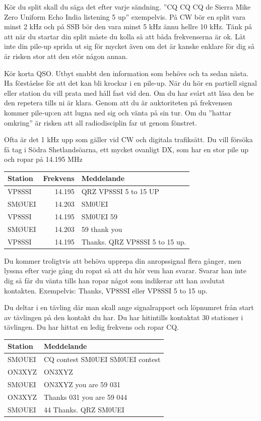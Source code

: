 Kör du split skall du säga det efter varje sändning. ''CQ CQ CQ de Sierra Mike
Zero Uniform Echo India listening 5 up'' exempelvis. På CW bör en split vara
minst 2 kHz och på SSB bör den vara minst 5 kHz ännu hellre 10 kHz. Tänk på att
när du startar din split måste du kolla så att båda frekvenserna är ok. Låt inte
din pile-up sprida ut sig för mycket även om det är kanske enklare för dig så är
risken stor att den stör någon annan.

Kör korta QSO. Utbyt snabbt den information som behövs och ta sedan nästa. Ha
förståelse för att det kan bli krockar i en pile-up. När du hör en partiell
signal eller station du vill prata med håll fast vid den. Om du har svårt att
läsa den be den repetera tills ni är klara. Genom att du är auktoriteten på
frekvensen kommer pile-up:en att lugna ned sig och vänta på sin tur. Om du
''hattar omkring'' är risken att all radiodisciplin far ut genom fönstret.

Ofta är det 1 kHz upp som gäller vid CW och digitala trafiksätt.  Du vill
försöka få tag i Södra Shetlandsöarna, ett mycket ovanligt DX, som har en stor
pile up och ropar på 14.195 MHz

\begin{tabular}{lrl}
	\textbf{Station} & \textbf{Frekvens} & \textbf{Meddelande}                     \\ \hline
	VP8SSI  &   14.195 & QRZ VP8SSI  5 to 15 UP         \\
	SMØUEI  &   14.203 & SM0UEI                         \\
	VP8SSI  &   14.195 & SM0UEI 59                      \\
	SMØUEI  &   14.203 & 59 thank you                   \\
	VP8SSI  &   14.195 & Thanks. QRZ VP8SSI 5 to 15 up.
\end{tabular}

Du kommer troligtvis att behöva upprepa din anropssignal flera gånger, men
lyssna efter varje gång du ropat så att du hör vem han svarar. Svarar han inte
dig så får du vänta tills han ropar något som indikerar att han avslutat
kontakten. Exempelvis: Thanks, VP8SSI eller VP8SSI 5 to 15 up.

Du deltar i en tävling där man skall ange signalrapport och löpnumret från
start av tävlingen på den kontakt du har. Du har hitintills kontaktat 30
stationer i tävlingen. Du har hittat en ledig frekvens och ropar CQ.

\begin{tabular}{ll}
	\textbf{Station} & \textbf{Meddelande}                       \\ \hline
	SMØUEI  & CQ contest SM0UEI SM0UEI contest \\
	ON3XYZ  & ON3XYZ                           \\
	SMØUEI  & ON3XYZ you are 59 031            \\
	ON3XYZ  & Thanks 031 you are 59 044        \\
	SMØUEI  & 44 Thanks. QRZ SM0UEI
\end{tabular}

